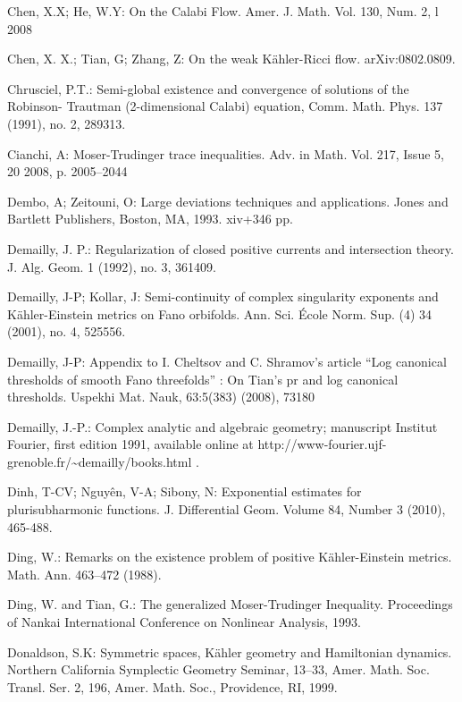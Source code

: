 \documentclass[11pt,oneside,english]{amsart}
\numberwithin{equation}{section}
\numberwithin{figure}{section}
\theoremstyle{plain}
\theoremstyle{plain}
\theoremstyle{plain}
\theoremstyle{plain}
\theoremstyle{remark}
\theoremstyle{definition}
\begin{document}
\begin{thebibliography}{10}
Chen, X.X; He, W.Y: On the Calabi Flow. Amer. J. Math.
Vol. 130, Num. 2, l 2008

Chen, X. X.; Tian, G; Zhang, Z: On the weak Kähler-Ricci
flow. arXiv:0802.0809.

Chrusciel, P.T.: Semi-global existence and convergence
of solutions of the Robinson- Trautman (2-dimensional Calabi) equation,
Comm. Math. Phys. 137 (1991), no. 2, 289\textendash{}313.

Cianchi, A: Moser-Trudinger trace inequalities. Adv.
in Math. Vol. 217, Issue 5, 20 2008, p. 2005--2044

Dembo, A; Zeitouni, O: Large deviations techniques
and applications. Jones and Bartlett Publishers, Boston, MA, 1993.
xiv+346 pp.

Demailly, J. P.: Regularization of closed positive
currents and intersection theory. J. Alg. Geom. 1 (1992), no. 3, 361\textendash{}409.

Demailly, J-P; Kollar, J: Semi-continuity of complex
singularity exponents and Kähler-Einstein metrics on Fano orbifolds.
Ann. Sci. École Norm. Sup. (4) 34 (2001), no. 4, 525\textendash{}556.

Demailly, J-P: Appendix to I. Cheltsov and C. Shramov's
article ``Log canonical thresholds of smooth Fano threefolds\textquotedblright{}
: On Tian's pr and log canonical thresholds. Uspekhi Mat. Nauk, 63:5(383)
(2008), 73\textendash{}180

Demailly, J.-P.: Complex analytic and algebraic geometry;
manuscript Institut Fourier, first edition 1991, available online
at http://www-fourier.ujf-grenoble.fr/\textasciitilde{}demailly/books.html
.

Dinh, T-CV; Nguyên, V-A; Sibony, N: Exponential estimates
for plurisubharmonic functions. J. Differential Geom. Volume 84, Number
3 (2010), 465-488.

Ding, W.: Remarks on the existence problem of positive
Kähler-Einstein metrics. Math. Ann. 463--472 (1988).

Ding, W. and Tian, G.: The generalized Moser-Trudinger
Inequality. Proceedings of Nankai International Conference on Nonlinear
Analysis, 1993.

Donaldson, S.K: Symmetric spaces, Kähler geometry and
Hamiltonian dynamics. Northern California Symplectic Geometry Seminar,
13--33, Amer. Math. Soc. Transl. Ser. 2, 196, Amer. Math. Soc., Providence,
RI, 1999.


\end{thebibliography}
\end{document}
